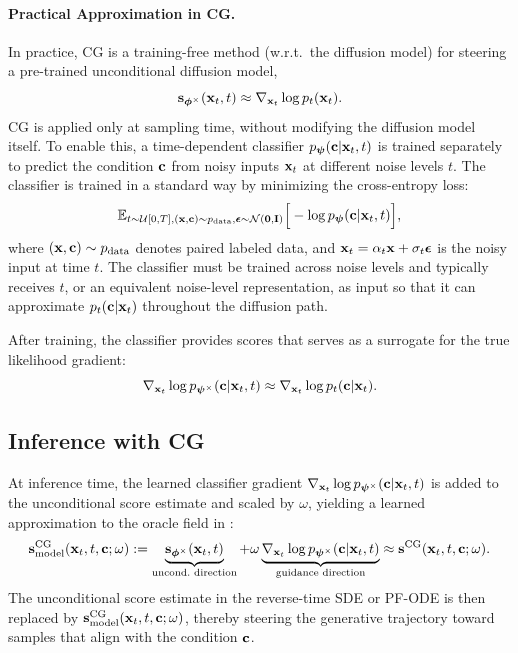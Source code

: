 \paragraph{Practical Approximation in CG.}
In practice, CG is a training-free method  (w.r.t.\ the diffusion model) for steering a pre-trained unconditional diffusion model,
\[
{\mathbf{s}}_{\bm{\phi}^\times}({\mathbf{x}}_t ,t) \approx \nabla_{{\mathbf{x}}_t} \log p_t({\mathbf{x}}_t).
\]
CG is applied only at sampling time, without modifying the diffusion model itself. To enable this, a time-dependent classifier $p_{{\bm{\psi}}}({\mathbf{c}} |{\mathbf{x}}_t,t)$ is trained separately to predict the condition ${\mathbf{c}}$ from noisy inputs ${\mathbf{x}}_t$ at different noise levels $t$. The classifier is trained in a standard way by minimizing the cross-entropy loss:
\begin{align}
\mathbb{E}_{t \sim \mathcal{U}[0,T], ({\mathbf{x}}, {\mathbf{c}}) \sim p_{\text{data}},  \bm{\epsilon} \sim \mathcal{N}(\mathbf{0}, \mathbf{I})}
\Big[ -\log p_{{\bm{\psi}}}({\mathbf{c}} | {\mathbf{x}}_t,t) \Big],
\end{align}
where $({\mathbf{x}},{\mathbf{c}})\sim p_{\text{data}}$ denotes paired labeled data, and ${\mathbf{x}}_t = \alpha_t {\mathbf{x}} + \sigma_t \bm{\epsilon}$ is the noisy input at time $t$. The classifier must be trained across noise levels and typically receives $t$, or an
equivalent noise-level representation, as input so that it can approximate
$p_t({\mathbf{c}}|{\mathbf{x}}_t)$ throughout the diffusion path.

After training, the classifier provides scores that serves as a surrogate for the true likelihood gradient:
\[
\nabla_{{\mathbf{x}}_t} \log p_{{\bm{\psi}}^\times}({\mathbf{c}} |{\mathbf{x}}_t,t) \approx \nabla_{{\mathbf{x}}_t} \log p_t({\mathbf{c}} |{\mathbf{x}}_t).
\]


\subsection{Inference with CG}
At inference time, the learned classifier gradient
$\nabla_{{\mathbf{x}}_t}\log p_{{\bm{\psi}}^\times}({\mathbf{c}}|{\mathbf{x}}_t,t)$ is added to the
unconditional score estimate and scaled by $\omega$, yielding a learned
approximation to the oracle field in :
\begin{align*}
\rvs^{\mathrm{CG}}_{\mathrm{model}}(\rvx_t,t,\rvc;\omega)
:=
\underbrace{\rvs_{\bm{\phi}^\times}(\rvx_t,t)}_{\text{uncond.\ direction}}
+
\omega
\underbrace{\nabla_{\rvx_t}\log
p_{\bpsi^\times}(\rvc|\rvx_t,t)}_{\text{guidance direction}}
\approx
\rvs^{\mathrm{CG}}(\rvx_t,t,\rvc;\omega).
\end{align*}
The unconditional score estimate in the reverse-time SDE or PF-ODE is then
replaced by
${\mathbf{s}}^{\mathrm{CG}}_{\mathrm{model}}({\mathbf{x}}_t,t,{\mathbf{c}};\omega)$, thereby steering the generative trajectory toward samples that align with the condition ${\mathbf{c}}$.



